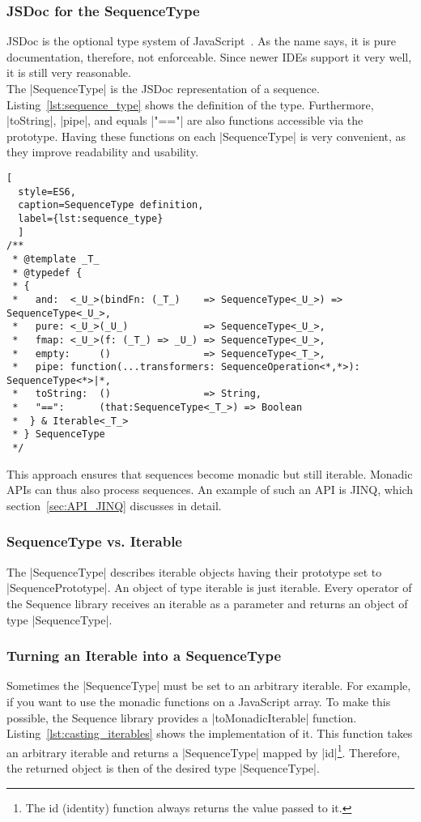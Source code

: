 \subsubsection{JSDoc for the SequenceType} %
\label{subsub:The SequenceType}
JSDoc is the optional type system of JavaScript~\cite{jsdoc_use_2023}. As the
name says, it is pure documentation, therefore, not enforceable. Since newer
IDEs support it very well, it is still very reasonable.\\
The |SequenceType| is the JSDoc representation of a sequence.
Listing~\ref{lst:sequence_type} shows the definition of the type. Furthermore,
|toString|, |pipe|, and equals |"=="| are also functions accessible via the
prototype. Having these functions on each |SequenceType| is very convenient,
as they improve readability and usability.

\begin{lstlisting}[
  style=ES6, 
  caption=SequenceType definition,
  label={lst:sequence_type}
  ]
/**
 * @template _T_
 * @typedef {
 * {
 *   and:  <_U_>(bindFn: (_T_)    => SequenceType<_U_>) => SequenceType<_U_>,
 *   pure: <_U_>(_U_)             => SequenceType<_U_>,
 *   fmap: <_U_>(f: (_T_) => _U_) => SequenceType<_U_>,
 *   empty:     ()                => SequenceType<_T_>,
 *   pipe: function(...transformers: SequenceOperation<*,*>): SequenceType<*>|*,
 *   toString:  ()                => String,
 *   "==":      (that:SequenceType<_T_>) => Boolean
 *  } & Iterable<_T_>
 * } SequenceType
 */
\end{lstlisting}

This approach ensures that sequences become monadic but still iterable.
Monadic APIs can thus also process sequences. An example of such an API is
JINQ, which section~\ref{sec:API_JINQ} discusses in detail.

\subsubsection{SequenceType vs. Iterable} %
\label{subsub:SequenceType vs. Iterable}
The |SequenceType| describes iterable objects having their
prototype set to |SequencePrototype|. An object of type iterable is just
iterable. 
Every operator of the Sequence library receives an iterable as a parameter and
returns an object of type |SequenceType|.

\subsubsection{Turning an Iterable into a SequenceType}
\label{subsub:Turn Iterables into SequenceType}
Sometimes the |SequenceType| must be set to an arbitrary iterable. For example,
if you want to use the monadic functions on a JavaScript array. To make this
possible, the Sequence library provides a |toMonadicIterable| function.
Listing~\ref{lst:casting_iterables} shows the
implementation of it. This function takes an arbitrary iterable and returns a
|SequenceType| mapped by |id|\footnote{The id (identity) function always
returns the value passed to it.}. 
Therefore, the returned object is then of the desired type |SequenceType|.

